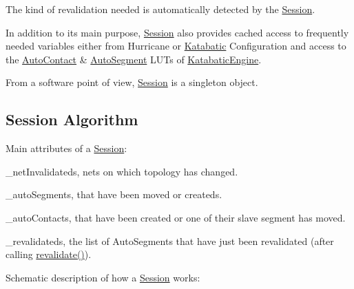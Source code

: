 The kind of revalidation needed is automatically detected by the \mbox{\hyperlink{classKatabatic_1_1Session}{Session}}.

In addition to it\textquotesingle{}s main purpose, \mbox{\hyperlink{classKatabatic_1_1Session}{Session}} also provides cached access to frequently needed variables either from Hurricane or \mbox{\hyperlink{namespaceKatabatic}{Katabatic}} Configuration and access to the \mbox{\hyperlink{classKatabatic_1_1AutoContact}{Auto\+Contact}} \& \mbox{\hyperlink{classKatabatic_1_1AutoSegment}{Auto\+Segment}} L\+U\+Ts of \mbox{\hyperlink{classKatabatic_1_1KatabaticEngine}{Katabatic\+Engine}}.

From a software point of view, \mbox{\hyperlink{classKatabatic_1_1Session}{Session}} is a singleton object.\hypertarget{classKatabatic_1_1Session_secSessionAlgo}{}\subsection{Session Algorithm}\label{classKatabatic_1_1Session_secSessionAlgo}
Main attributes of a \mbox{\hyperlink{classKatabatic_1_1Session}{Session}}\+:
\begin{DoxyItemize}
\item {\ttfamily \+\_\+net\+Invalidateds}, nets on which topology has changed.
\item {\ttfamily \+\_\+auto\+Segments}, that have been moved or createds.
\item {\ttfamily \+\_\+auto\+Contacts}, that have been created or one of their slave segment has moved.
\item {\ttfamily \+\_\+revalidateds}, the list of Auto\+Segments that have just been revalidated (after calling {\ttfamily \mbox{\hyperlink{classKatabatic_1_1Session_a4da9e28432c1fdb0c754717487d9cc83}{revalidate()}}}).
\end{DoxyItemize}

Schematic description of how a \mbox{\hyperlink{classKatabatic_1_1Session}{Session}} works\+:


